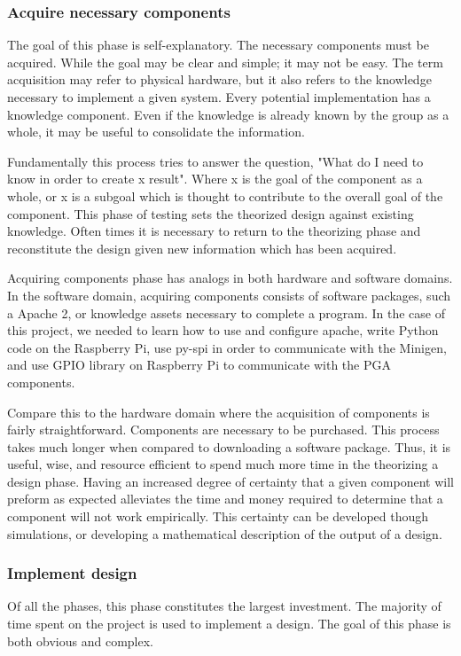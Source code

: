 \documentclass{article}	%
\begin{document}
\begin{multicols}{2}
\subsubsection{Acquire necessary components}
The goal of this phase is self-explanatory.
The necessary components must be acquired.
While the goal may be clear and simple;
it may not be easy.
The term acquisition may refer to  physical hardware,
but it also refers to the knowledge necessary to implement
a given system.
Every potential implementation has a knowledge component.
Even if the knowledge is already known by the group as a whole,
it may be useful to consolidate the information.

Fundamentally this process tries to answer the question,
"What do I need to know in order to create x result".
Where x is the goal of the component as a whole, or
x is a subgoal which is thought to contribute to 
the overall goal of the component.
This phase of testing
sets the theorized design against existing knowledge.
Often times it is necessary to return to the 
theorizing phase and reconstitute the design
given new information which has been acquired.

Acquiring components phase has analogs in both hardware and software domains.
In the software domain,
acquiring components consists of
software packages, such a Apache 2, or
knowledge assets necessary to complete a program.
In the case of this project,
we needed to learn how to use and configure apache,
write Python code on the Raspberry Pi,
use py-spi in order to communicate with the Minigen, and
use GPIO library on Raspberry Pi to communicate with the PGA components.

Compare this to the hardware domain where
the acquisition of components is fairly straightforward.
Components are necessary to be purchased.
This process takes much longer when compared
to downloading a software package.
Thus, it is useful, wise, and resource efficient to
spend much more time in the theorizing a design phase.
Having an increased degree of certainty that 
a given component will preform as expected
alleviates the time and money required to determine 
that a component will not work empirically.
This certainty can be developed though simulations, or
developing a mathematical description of the output of a design.

\subsubsection{Implement design}
Of all the phases, 
this phase constitutes the largest investment.
The majority of time spent on the project is
used to implement a design.
The goal of this phase is both obvious
and complex.


\end{multicols}
\end{document}
